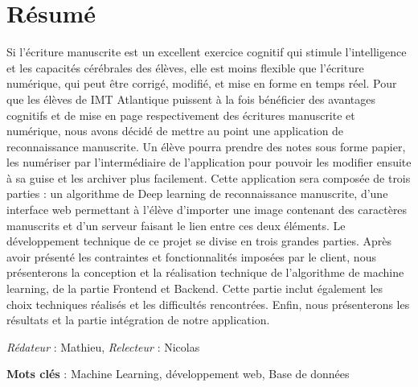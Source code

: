 \documentclass[oneside,a4paper,13pt]{article}
\begin{document}
\section*{Résumé}

Si l’écriture manuscrite est un excellent exercice cognitif qui stimule l'intelligence et les capacités cérébrales des élèves, elle est moins flexible que l’écriture numérique, qui peut être corrigé, modifié, et mise en forme en temps réel. Pour que les élèves de IMT Atlantique puissent à la fois bénéficier des avantages cognitifs et de mise en page respectivement des écritures manuscrite et numérique, nous avons décidé de mettre au point une application de reconnaissance manuscrite. 
\smallbreak
Un élève pourra prendre des notes sous forme papier, les numériser par l’intermédiaire de l’application pour pouvoir les modifier ensuite à sa guise et les archiver plus facilement. Cette application sera composée de trois parties : un algorithme de Deep learning de reconnaissance manuscrite, d’une interface web permettant à l’élève d’importer une image contenant des caractères manuscrits et d’un serveur faisant le lien entre ces deux éléments. 
\smallbreak
Le développement technique de ce projet se divise en trois grandes parties. Après avoir présenté les contraintes et fonctionnalités imposées par le client, nous présenterons la conception et la réalisation technique de l’algorithme de machine learning, de la partie Frontend et Backend. Cette partie inclut également les choix techniques réalisés et les difficultés rencontrées. Enfin, nous présenterons les résultats et la partie intégration de notre application. 
\medbreak

\textit{Rédateur} : Mathieu, \textit{Relecteur} : Nicolas

\textbf{Mots clés} : Machine Learning, développement web, Base de données
\end{document}
